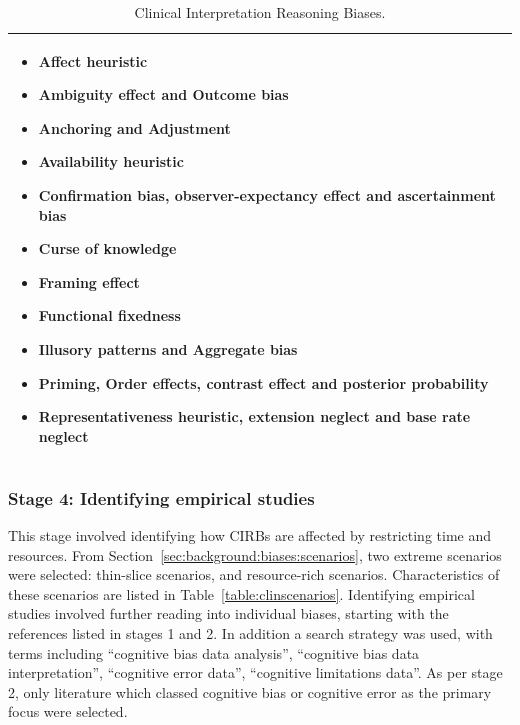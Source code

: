 \documentclass[a4paper]{scrartcl}     %
\begin{document}
    \begin{table}
      \caption{Clinical Interpretation Reasoning Biases.}
      \renewcommand{\arraystretch}{0}
      \begin{tabu} to \linewidth {X[1,l]}
        \toprule
        \begin{multicols}{3}
         \begin{itemize}[label={}]
          \item Affect heuristic
          \item Ambiguity effect and Outcome bias
          \item Anchoring and Adjustment
          \item Availability heuristic \columnbreak
          \item Confirmation bias, observer-expectancy effect and ascertainment bias
          \item Curse of knowledge
          \item Framing effect
          \item Functional fixedness
          \item Illusory patterns and Aggregate bias
          \item Priming, Order effects, contrast effect and posterior probability
          \item Representativeness heuristic, extension neglect and base rate neglect
        \end{itemize}
        \end{multicols} \\
        \bottomrule
      \end{tabu}
      \label{table:cirbs}
    \end{table}

  \subsubsection*{Stage 4: Identifying empirical studies}

    This stage involved identifying how CIRBs are affected by restricting time and resources. From Section~\ref{sec:background:biases:scenarios}, two extreme scenarios were selected: thin-slice scenarios, and resource-rich scenarios. Characteristics of these scenarios are listed in Table~\ref{table:clinscenarios}. Identifying empirical studies involved further reading into individual biases, starting with the references listed in stages 1 and 2. In addition a search strategy was used, with terms including ``cognitive bias data analysis'', ``cognitive bias data interpretation'', ``cognitive error data'', ``cognitive limitations data''. As per stage 2, only literature which classed cognitive bias or cognitive error as the primary focus were selected.
\end{document}
